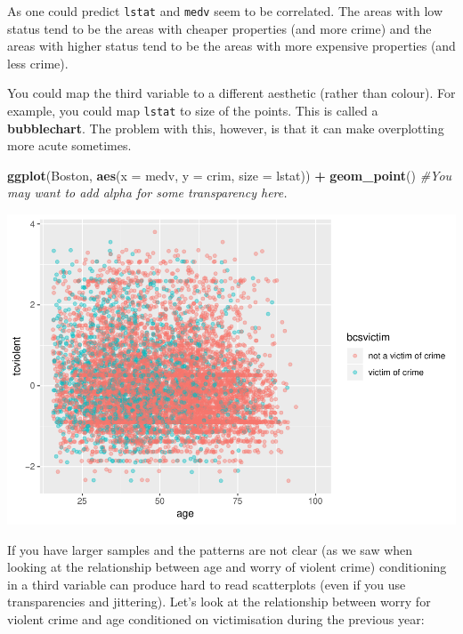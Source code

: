 \documentclass[]{book}
\newenvironment{Shaded}{\begin{snugshade}}{\end{snugshade}}
\newcommand{\CommentTok}[1]{\textcolor[rgb]{0.56,0.35,0.01}{\textit{#1}}}
\newcommand{\DataTypeTok}[1]{\textcolor[rgb]{0.13,0.29,0.53}{#1}}
\newcommand{\KeywordTok}[1]{\textcolor[rgb]{0.13,0.29,0.53}{\textbf{#1}}}
\newcommand{\NormalTok}[1]{#1}
\newcommand{\OperatorTok}[1]{\textcolor[rgb]{0.81,0.36,0.00}{\textbf{#1}}}
\newcommand{\StringTok}[1]{\textcolor[rgb]{0.31,0.60,0.02}{#1}}
\theoremstyle{definition}
\theoremstyle{definition}
\theoremstyle{definition}
\theoremstyle{remark}
\begin{document}
As one could predict \texttt{lstat} and \texttt{medv} seem to be
correlated. The areas with low status tend to be the areas with cheaper
properties (and more crime) and the areas with higher status tend to be
the areas with more expensive properties (and less crime).

You could map the third variable to a different aesthetic (rather than
colour). For example, you could map \texttt{lstat} to size of the
points. This is called a \textbf{bubblechart}. The problem with this,
however, is that it can make overplotting more acute sometimes.

\begin{Shaded}
\begin{Highlighting}[]
\KeywordTok{ggplot}\NormalTok{(Boston, }\KeywordTok{aes}\NormalTok{(}\DataTypeTok{x =}\NormalTok{ medv, }\DataTypeTok{y =}\NormalTok{ crim, }\DataTypeTok{size =}\NormalTok{ lstat)) }\OperatorTok{+}
\StringTok{  }\KeywordTok{geom_point}\NormalTok{() }\CommentTok{#You may want to add alpha for some transparency here.}
\end{Highlighting}
\end{Shaded}

\includegraphics{03-visualisation_files/figure-latex/unnamed-chunk-47-1.pdf}

If you have larger samples and the patterns are not clear (as we saw
when looking at the relationship between age and worry of violent crime)
conditioning in a third variable can produce hard to read scatterplots
(even if you use transparencies and jittering). Let's look at the
relationship between worry for violent crime and age conditioned on
victimisation during the previous year:
\end{document}
